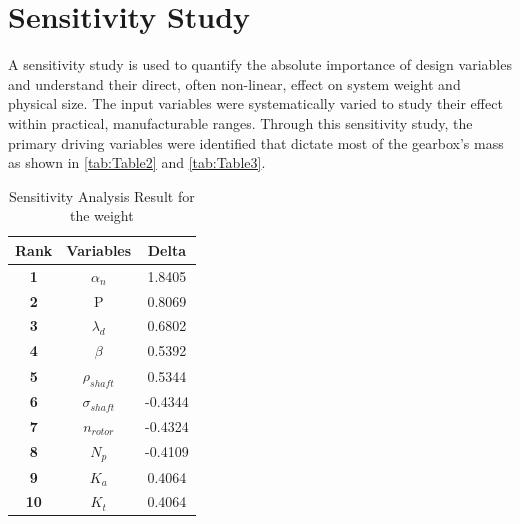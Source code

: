 \section{Sensitivity Study}
    A sensitivity study is used to quantify the absolute importance of design variables and understand their direct, 
    often non-linear, effect on system weight and physical size. The input variables were systematically varied to 
    study their effect within practical, manufacturable ranges. Through this sensitivity study, the primary driving 
    variables were identified that dictate most of the gearbox's mass as shown in \autoref{tab:Table2} and \autoref{tab:Table3}.

        \begin{table}[ht]
			\renewcommand{\arraystretch}{1.5}
			\centering
			\caption{Sensitivity Analysis Result for the weight}
			\label{tab:Table2}
			\small
			\begin{tabular}{|c|c|c|}
				\hline
        		\textbf{Rank} & \textbf{Variables} & \textbf{Delta} \\					
				\hline
				\textbf{1} & $\alpha_{n}$ & 1.8405 \\
				\hline
				\textbf{2} & P & 0.8069 \\
				\hline
				\textbf{3} & $\lambda_{d}$ & 0.6802 \\
				\hline
				\textbf{4} & $\beta$ & 0.5392 \\
				\hline
				\textbf{5} & $\rho_{shaft}$ & 0.5344 \\
				\hline
				\textbf{6} & $\sigma_{shaft}$ & -0.4344 \\
				\hline
				\textbf{7} & $n_{rotor}$ & -0.4324 \\
				\hline
				\textbf{8} & $N_{p}$ & -0.4109 \\
				\hline
				\textbf{9} & $K_{a}$ & 0.4064 \\
				\hline
				\textbf{10} & $K_{t}$ & 0.4064 \\
				\hline
            \end{tabular}
		\end{table}

